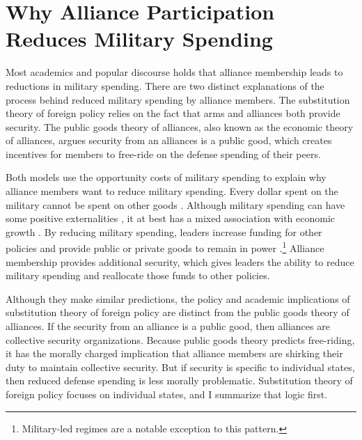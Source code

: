 \documentclass[12pt]{article}
\begin{document}
\section{Why Alliance Participation Reduces Military Spending}

Most academics and popular discourse holds that alliance membership leads to reductions in military spending. 
There are two distinct explanations of the process behind reduced military spending by alliance members. 
The substitution theory of foreign policy relies on the fact that arms and alliances both provide security. 
The public goods theory of alliances, also known as the economic theory of alliances, argues security from an alliances is a public good, which creates incentives for members to free-ride on the defense spending of their peers. 


Both models use the opportunity costs of military spending to explain why alliance members want to reduce military spending. 
Every dollar spent on the military cannot be spent on other goods \citep{Powell1993, JacksonMorelli2008, Fearon2018}. 
Although military spending can have some positive externalities \citep{WhittenWilliams2011}, it at best has a mixed association with economic growth \citep{DegerSen1995, ShinWard1999, ScanlanJenkins2001, AlptekinLevine2012}. 
By reducing military spending, leaders increase funding for other policies and provide public or private goods to remain in power \citep{BDMetal2002}.\footnote{Military-led regimes are a notable exception to this pattern.} 
Alliance membership provides additional security, which gives leaders the ability to reduce military spending and reallocate those funds to other policies. 


Although they make similar predictions, the policy and academic implications of substitution theory of foreign policy are distinct from the public goods theory of alliances. 
If the security from an alliance is a public good, then alliances are collective security organizations. 
Because public goods theory predicts free-riding, it has the morally charged implication that alliance members are shirking their duty to maintain collective security. 
But if security is specific to individual states, then reduced defense spending is less morally problematic.
Substitution theory of foreign policy focuses on individual states, and I summarize that logic first. 
\end{document}
